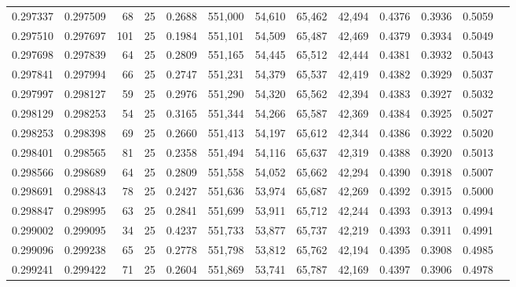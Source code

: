 \begin{tabular}{rrrrrrrrrrrrr}
0.297337 & 0.297509 &    68 &  25 &                                     0.2688 & 551,000 &  54,610 &  65,462 &  42,494 & 0.4376 & 0.3936 & 0.5059 \\
0.297510 & 0.297697 &   101 &  25 &                                     0.1984 & 551,101 &  54,509 &  65,487 &  42,469 & 0.4379 & 0.3934 & 0.5049 \\
0.297698 & 0.297839 &    64 &  25 &                                     0.2809 & 551,165 &  54,445 &  65,512 &  42,444 & 0.4381 & 0.3932 & 0.5043 \\
0.297841 & 0.297994 &    66 &  25 &                                     0.2747 & 551,231 &  54,379 &  65,537 &  42,419 & 0.4382 & 0.3929 & 0.5037 \\
0.297997 & 0.298127 &    59 &  25 &                                     0.2976 & 551,290 &  54,320 &  65,562 &  42,394 & 0.4383 & 0.3927 & 0.5032 \\
0.298129 & 0.298253 &    54 &  25 &                                     0.3165 & 551,344 &  54,266 &  65,587 &  42,369 & 0.4384 & 0.3925 & 0.5027 \\
0.298253 & 0.298398 &    69 &  25 &                                     0.2660 & 551,413 &  54,197 &  65,612 &  42,344 & 0.4386 & 0.3922 & 0.5020 \\
0.298401 & 0.298565 &    81 &  25 &                                     0.2358 & 551,494 &  54,116 &  65,637 &  42,319 & 0.4388 & 0.3920 & 0.5013 \\
0.298566 & 0.298689 &    64 &  25 &                                     0.2809 & 551,558 &  54,052 &  65,662 &  42,294 & 0.4390 & 0.3918 & 0.5007 \\
0.298691 & 0.298843 &    78 &  25 &                                     0.2427 & 551,636 &  53,974 &  65,687 &  42,269 & 0.4392 & 0.3915 & 0.5000 \\
0.298847 & 0.298995 &    63 &  25 &                                     0.2841 & 551,699 &  53,911 &  65,712 &  42,244 & 0.4393 & 0.3913 & 0.4994 \\
0.299002 & 0.299095 &    34 &  25 &                                     0.4237 & 551,733 &  53,877 &  65,737 &  42,219 & 0.4393 & 0.3911 & 0.4991 \\
0.299096 & 0.299238 &    65 &  25 &                                     0.2778 & 551,798 &  53,812 &  65,762 &  42,194 & 0.4395 & 0.3908 & 0.4985 \\
0.299241 & 0.299422 &    71 &  25 &                                     0.2604 & 551,869 &  53,741 &  65,787 &  42,169 & 0.4397 & 0.3906 & 0.4978 \\

\end{tabular}
